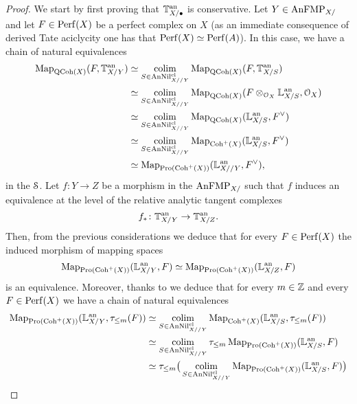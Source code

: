 \documentclass[10pt,a4paper,reqno]{amsart} %
\theoremstyle{plain}
\theoremstyle{definition}
\theoremstyle{remark}
\numberwithin{equation}{section}
\begin{document}
\begin{proof}
    We start by first proving that $\mathbb T^\mathrm{an}_{X/ \bullet}$ is conservative. Let $Y \in \mathrm{AnFMP}_{X/}$ and let $F \in \mathrm{Perf}(X)$ be a perfect complex on $X$
    (as an immediate consequence
    of derived Tate aciclycity one has that $\mathrm{Perf}(X) \simeq \mathrm{Perf}(A)$). In this case, we have a chain of natural equivalences
        \begin{align*}
            \operatorname{Map}_{\mathrm{QCoh}(X)}(F, \mathbb T^\mathrm{an}_{X/Y}) & \simeq \operatorname*{colim}_{S \in \mathrm{AnNil}^{\mathrm{cl}}_{X/ /Y}} \operatorname{Map}_{\mathrm{QCoh}(X)}(F, \mathbb T^\mathrm{an}_{X/S} ) \\
                                              & \simeq \operatorname*{colim}_{S \in \mathrm{AnNil}^{\mathrm{cl}}_{X/ /Y}} \operatorname{Map}_{\mathrm{QCoh}(X)}(F \otimes_{\mathcal O_X} \mathbb L^\mathrm{an}_{X/S}, \mathcal O_X) \\
                                              & \simeq \operatorname*{colim}_{S \in \mathrm{AnNil}^{\mathrm{cl}}_{X/ /Y}} \operatorname{Map}_{\mathrm{QCoh}(X)}(\mathbb L^\mathrm{an}_{X/S}, F^\vee) \\
                                              & \simeq \operatorname*{colim}_{S \in \mathrm{AnNil}^{\mathrm{cl}}_{X/ /Y}} \operatorname{Map}_{\mathrm{Coh}^+(X)}(\mathbb L^\mathrm{an}_{X/S}, F^\vee) \\
                                              & \simeq \operatorname{Map}_{\mathrm{Pro}(\mathrm{Coh}^+(X))}(\mathbb L^\mathrm{an}_{X/ /Y}, F^\vee), 
        \end{align*}
    in the \infcat $\mathcal S$. Let $f \colon Y \to Z$ be a morphism in the \infcat $\mathrm{AnFMP}_{X/}$ such that $f$ induces an equivalence at the level of the relative
    analytic tangent complexes
        \[
            f_* \colon \mathbb T^\mathrm{an}_{X/Y} \to \mathbb T^\mathrm{an}_{X/Z}.  
        \]
    Then, from the previous considerations we deduce that for every $F \in \mathrm{Perf}(X)$ the induced morphism of mapping spaces
        \[
              \operatorname{Map}_{\mathrm{Pro}(\mathrm{Coh}^+(X))}(\mathbb L^\mathrm{an}_{X/ Y}, F) \simeq \operatorname{Map}_{\mathrm{Pro}(\mathrm{Coh}^+(X))}(\mathbb L^\mathrm{an}_{X/Z}, F)
        \]
    is an equivalence. Moreover, thanks to \cite[Corollary 5.5.6.22]{HTT} we deduce that for every $m \in \mathbb Z$ and every $F \in \mathrm{Perf}(X)$ we have a chain
    of natural equivalences
        \begin{align*}
            \Map_{\pro(\Coh^+(X))}(\bbL\an_{X/Y}, \tau_{\le m}(F)) & \simeq \colim_{S \in \anNil^\cl_{X/ /Y}} \Map_{\Coh^+(X)}(\bbL\an_{X/S}, \tau_{\le m}(F)) \\
                                                                   & \simeq \colim_{S \in \anNil^\cl_{X/ /Y}} \tau_{\le m} \Map_{\pro(\Coh^+(X))}(\bbL\an_{X/S}, F) \\
                                                                   & \simeq \tau_{\le m} \big( \colim_{S \in \anNil^\cl_{X/ /Y}} \Map_{\pro(\Coh^+(X))}(\bbL\an_{X/ S}, F) \big) \\

\end{align*}
\end{proof}
\end{document}
